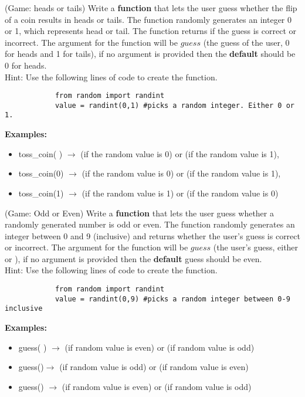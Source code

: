 



	\item 
		(Game: heads or tails)  Write a \textbf{function} that lets the user guess whether the flip of a coin 
		results in heads or tails. The function randomly generates an integer 0 or 1, which 
		represents head or tail. The function returns if the guess is correct or incorrect. The argument for the function will be $guess$ 
		(the guess of the user, 0 for heads and 1 for tails), if no argument is provided then the \textbf{default} should be 0 for heads.\\
		Hint: Use the following lines of code to create the function.
		\begin{verbatim}
		    from random import randint
		    value = randint(0,1) #picks a random integer. Either 0 or 1.
		\end{verbatim}
		\textbf{Examples:}
		\begin{itemize}
			\item  toss\_coin( ) $\rightarrow$  (if the random value is 0) or 
				 (if the random value is 1), 
			\item  toss\_coin(0) $\rightarrow$  (if the random value is 0) or 
				 (if the random value is 1), 
			\item  toss\_coin(1) $\rightarrow$  (if the random value is 1) or 
				 (if the random value is 0) 
		\end{itemize}

	\item 
		(Game: Odd or Even)  Write a \textbf{function} that lets the user guess whether a randomly 
		generated number is odd or even.  The function randomly generates an integer between 0 and 9 
		(inclusive) and returns whether the user's guess is correct or incorrect. The argument for 
		the function will be $guess$ (the user's guess, either  or ), if no 
		argument is provided then the \textbf{default} guess should be even.\\
		Hint: Use the following lines of code to create the function.
		\begin{verbatim}
		    from random import randint
		    value = randint(0,9) #picks a random integer between 0-9 inclusive
		\end{verbatim}
		\textbf{Examples:}
		\begin{itemize}
			\item  guess( ) $\rightarrow$  (if random value is even) 
				or  (if random value is odd) 
			\item  guess()$\rightarrow$ (if random value is odd) 
				or  (if random value is even)
			\item  guess() $\rightarrow$  (if random value is even) 
				or  (if random value is odd) 
		\end{itemize}

